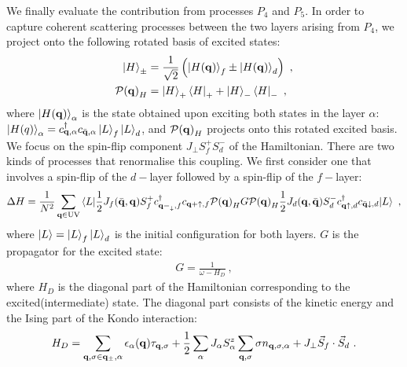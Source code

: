 We finally evaluate the contribution from processes \(P_4\) and \(P_5\). In order to capture coherent scattering processes between the two layers arising from \(P_4\), we project onto the following rotated basis of excited states:
\begin{equation}\begin{aligned}
	\ket{H}_\pm &= \frac{1}{\sqrt{2}}\left(\ket{H({\bf q})}_f \pm \ket{H({\bf q})}_d\right)~,\\
	\mathcal{P({\bf q})}_H &= \ket{H}_+\bra{H}_+ + \ket{H}_-\bra{H}_-~,
\end{aligned}\end{equation}
where \(\ket{H({\bf q})}_\alpha\) is the state obtained upon exciting both states in the layer \(\alpha\): \(\ket{H(q)}_\alpha = c^\dagger_{{\bf q},\alpha}c_{\bar {\bf q},\alpha}\ket{L}_f\ket{L}_d\), and \(\mathcal{P({\bf q})}_H\) projects onto this rotated excited basis. We focus on the spin-flip component \(J_\perp S_f^+ S_d^-\) of the Hamiltonian. There are two kinds of processes that renormalise this coupling. We first consider one that involves a spin-flip of the \(d-\)layer followed by a spin-flip of the \(f-\)layer:
\begin{equation}\begin{aligned}\label{rgEqtn1}
	\Delta H = \frac{1}{N^2}\sum_{{\bf q} \in \text{UV}}\braket{L | \frac{1}{2}J_f(\bar{\bf q},{\bf q}) S_f^+ c^\dagger_{{\bf q-}_\downarrow,f}c_{{\bf q+}\uparrow,f} \mathcal{P({\bf q})}_H G \mathcal{P({\bf q})}_H\frac{1}{2}J_d({\bf q},\bar{\bf q})S_d^- c^\dagger_{{\bf q}\uparrow,d}c_{\bar {\bf q}\downarrow,d} | L }~,
\end{aligned}\end{equation}
where \(\ket{L} = \ket{L}_f \ket{L}_d\) is the initial configuration for both layers. \(G\) is the propagator for the excited state:
\begin{equation}\begin{aligned}
	G = \frac{1}{\omega - H_D}~,
\end{aligned}\end{equation}
where \(H_D\) is the diagonal part of the Hamiltonian corresponding to the excited(intermediate) state. The diagonal part consists of the kinetic energy and the Ising part of the Kondo interaction:
\begin{equation}\begin{aligned}
	H_D = \sum_{{\bf q,\sigma}\in{\bf q}_\pm, \alpha}\epsilon_\alpha({\bf q})\tau_{{\bf q},\sigma} + \frac{1}{2}\sum_\alpha J_\alpha S_\alpha^z \sum_{{\bf q},\sigma}\sigma n_{{\bf q},\sigma,\alpha} + J_\perp \vec{S}_f \cdot \vec{S}_d~.
\end{aligned}\end{equation}
